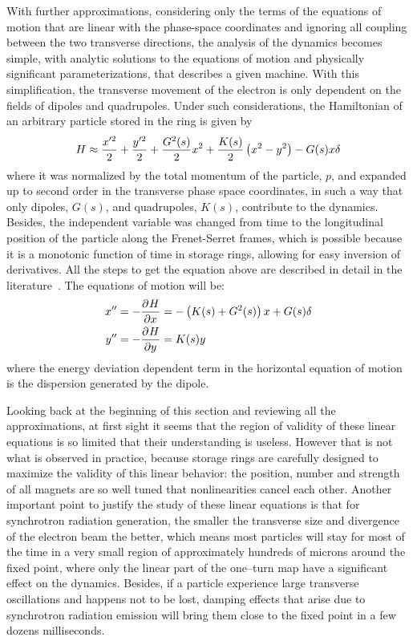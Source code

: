 	With further approximations, considering only the terms of the equations of motion that are linear with the phase-space coordinates and ignoring all coupling between the two transverse directions, the analysis of the dynamics becomes simple, with analytic solutions to the equations of motion and physically significant parameterizations, that describes a given machine. With this simplification, the transverse movement of the electron is only dependent on the fields of dipoles and quadrupoles. Under such considerations, the Hamiltonian of an arbitrary particle stored in the ring is given by
    \begin{align}\label{eq:approximated_hamiltonian}
        H \approx \frac{x'^2}{2} + \frac{y'^2}{2} + \frac{G^2(s)}{2}x^2 + \frac{K(s)}{2}\left(x^2-y^2\right) - G(s)x\delta
    \end{align}
    where it was normalized by the total momentum of the particle, $p$, and expanded up to second order in the transverse phase space coordinates, in such a way that only dipoles, $G(s)$, and quadrupoles, $K(s)$, contribute to the dynamics. Besides, the independent variable was changed from time to the longitudinal position of the particle along the Frenet-Serret frames, which is possible because it is a monotonic function of time in storage rings, allowing for easy inversion of derivatives. All the steps to get the equation above are described in detail in the literature~\cite{Bengtsson1997,Lee1999,Wiedemann2007}. The equations of motion will be:
    \begin{align}\label{eq:linear_equation_motion}
        x'' &= -\frac{\partial^{{}}H}{\partial x^{{}}} = -\left(K(s)+G^2(s)\right)x + G(s)\delta\\\nonumber
        y'' &= -\frac{\partial^{{}}H}{\partial y^{{}}} = K(s)y
    \end{align}
    where the energy deviation dependent term in the horizontal equation of motion is the dispersion generated by the dipole.

	Looking back at the beginning of this section and reviewing all the approximations, at first sight it seems that the region of validity of these linear equations is so limited that their understanding is useless. However that is not what is observed in practice, because storage rings are carefully designed to maximize the validity of this linear behavior: the position, number and strength of all magnets are so well tuned that nonlinearities cancel each other. Another important point to justify the study of these linear equations is that for synchrotron radiation generation, the smaller the transverse size and divergence of the electron beam the better, which means most particles will stay for most of the time in a very small region of approximately hundreds of microns around the fixed point, where only the linear part of the one--turn map have a significant effect on the dynamics. Besides, if a particle experience large transverse oscillations and happens not to be lost, damping effects that arise due to synchrotron radiation emission will bring them close to the fixed point in a few dozens milliseconds.

